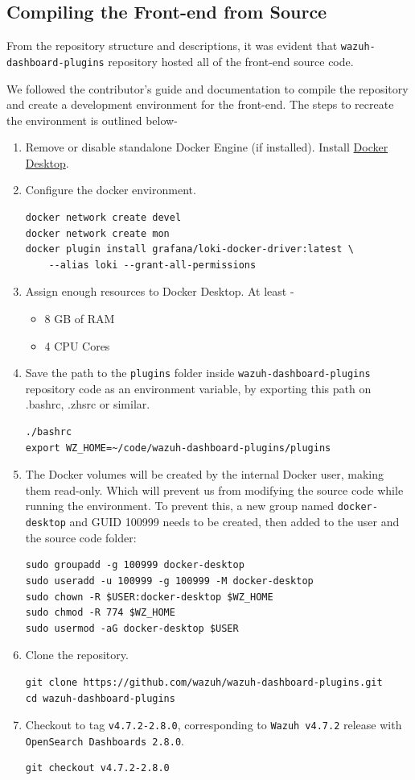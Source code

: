 \subsection{Compiling the Front-end from Source}
From the repository structure and descriptions, it was evident that \texttt{wazuh-dashboard-plugins} repository hosted all of the front-end source code.

We followed the contributor's guide and documentation to compile the repository and create a development environment for the front-end. The steps to recreate the environment is outlined below-

\begin{enumerate}
    \item Remove or disable standalone Docker Engine (if installed). Install \href{https://docs.docker.com/get-docker/}{Docker Desktop}.
    \item Configure the docker environment.
    \begin{verbatim}
docker network create devel
docker network create mon
docker plugin install grafana/loki-docker-driver:latest \
    --alias loki --grant-all-permissions
    \end{verbatim}
    \item Assign enough resources to Docker Desktop. At least -
    \begin{itemize}
        \item 8 GB of RAM
        \item 4 CPU Cores
    \end{itemize}
    \item Save the path to the \texttt{plugins} folder inside \texttt{wazuh-dashboard-plugins} repository code as an environment variable, by exporting this path on .bashrc, .zhsrc or similar.
    \begin{verbatim}
./bashrc
export WZ_HOME=~/code/wazuh-dashboard-plugins/plugins
    \end{verbatim}
    \item The Docker volumes will be created by the internal Docker user, making them read-only. Which will prevent us from modifying the source code while running the environment. To prevent this, a new group named \texttt{docker-desktop} and GUID 100999 needs to be created, then added to the user and the source code folder:
    \begin{verbatim}
sudo groupadd -g 100999 docker-desktop
sudo useradd -u 100999 -g 100999 -M docker-desktop
sudo chown -R $USER:docker-desktop $WZ_HOME
sudo chmod -R 774 $WZ_HOME
sudo usermod -aG docker-desktop $USER
    \end{verbatim}
    \item Clone the repository.
    \begin{verbatim}
git clone https://github.com/wazuh/wazuh-dashboard-plugins.git
cd wazuh-dashboard-plugins
    \end{verbatim}
    \item Checkout to tag \texttt{v4.7.2-2.8.0}, corresponding to \texttt{Wazuh v4.7.2} release with \texttt{OpenSearch Dashboards 2.8.0}.
    \begin{verbatim}
git checkout v4.7.2-2.8.0
    \end{verbatim}


\end{enumerate}
